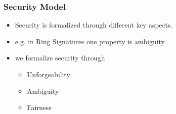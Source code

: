 \begin{frame}
	\frametitle{Security Model}

	\begin{itemize}
		\item Security is formalized through different key aspects.
		\item e.g. in Ring Signatures one property is ambiguity
		\item we formalize security through
			\begin{itemize}
				\item Unforgeability
				\item Ambiguity
				\item Fairness
			\end{itemize}
	\end{itemize}
\end{frame}